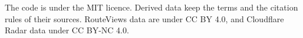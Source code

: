 
The code is under the MIT licence.
Derived data keep the terms and the citation rules of their sources.
RouteViews data are under CC BY 4.0, and Cloudflare Radar data under CC BY-NC 4.0.

